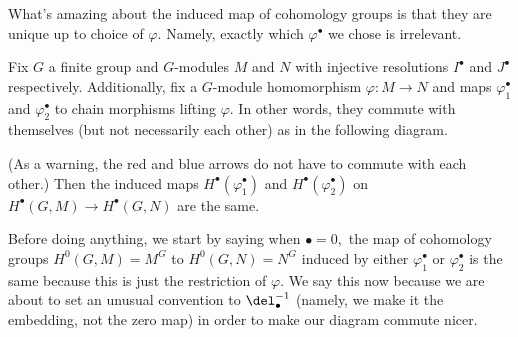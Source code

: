 What's amazing about the induced map of cohomology groups is that they are unique up to choice of $\varphi.$ Namely, exactly which $\varphi^\bullet$ we chose is irrelevant.
\begin{lemma}
    Fix $G$ a finite group and $G$-modules $M$ and $N$ with injective resolutions $I^\bullet$ and $J^\bullet$ respectively. Additionally, fix a $G$-module homomorphism $\varphi:M\to N$ and maps $\varphi_1^\bullet$ and $\varphi_2^\bullet$ to chain morphisms lifting $\varphi.$ In other words, they commute with themselves (but not necessarily each other) as in the following diagram.
    \begin{center}
    \end{center}
    (As a warning, the red and blue arrows do not have to commute with each other.) Then the induced maps $H^\bullet(\varphi_1^\bullet)$ and $H^\bullet\left(\varphi_2^\bullet\right)$ on $H^\bullet(G,M)\to H^\bullet(G,N)$ are the same.
\end{lemma}
Before doing anything, we start by saying when $\bullet=0,$ the map of cohomology groups $H^0(G,M)=M^G$ to $H^0(G,N)=N^G$ induced by either $\varphi_1^\bullet$ or $\varphi_2^\bullet$ is the same because this is just the restriction of $\varphi.$ We say this now because we are about to set an unusual convention to $\del_\bullet^{-1}$ (namely, we make it the embedding, not the zero map) in order to make our diagram commute nicer.

